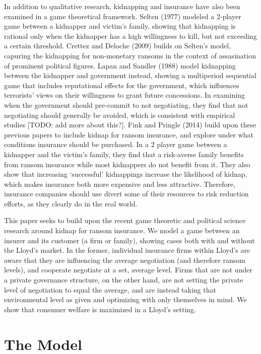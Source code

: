 \documentclass[12pt]{article}
\begin{document}
In addition to qualitative research, kidnapping and insurance have also been examined in a game theoretical framework. Selten (1977) modeled a 2-player game between a kidnapper and victim's family, showing that kidnapping is rational only when the kidnapper has a high willingness to kill, but not exceeding a certain threshold. Crettez and Deloche (2009) builds on Selten's model, capuring the kidnapping for non-monetary ransoms in the context of assasination of prominent political figures. Lapan and Sandler (1988) model kidnapping between the kidnapper and government instead, showing a multiperiod sequential game that includes reputational effects for the government, which influences terrorists' views on their willingness to grant future concessions. In examining when the government should pre-commit to not negotiating, they find that not negotiating should generally be avoided, which is consistent with empirical studies [TODO: add more about this?]. Fink and Pringle (2014) build upon these previous papers to include kidnap for ransom insurance, and explore under what conditions insurance should be purchased. In a 2 player game between a kidnapper and the victim's family, they find that a risk-averse family benefits from ransom insurance while most kidnappers do not benefit from it. They also show that increasing `successful' kidnappings increase the likelihood of kidnap, which makes insurance both more expensive and less attractive. Therefore, insurance companies should use divert some of their resources to risk reduction efforts, as they clearly do in the real world.

This paper seeks to build upon the recent game theoretic and political science research around kidnap for ransom insurance. We model a game between an insurer and its customer (a firm or family), showing cases both with and without the Lloyd's market. In the former, individual insurance firms within Lloyd's are aware that they are influencing the average negotiation (and therefore ransom levels), and cooperate negotiate at a set, average level. Firms that are not under a private governance structure, on the other hand, are not setting the private level of negotiation to equal the average, and are instead taking that environmental level as given and optimizing with only themselves in mind. We show that consumer welfare is maximized in a Lloyd's setting.

\section{The Model}
\end{document}

